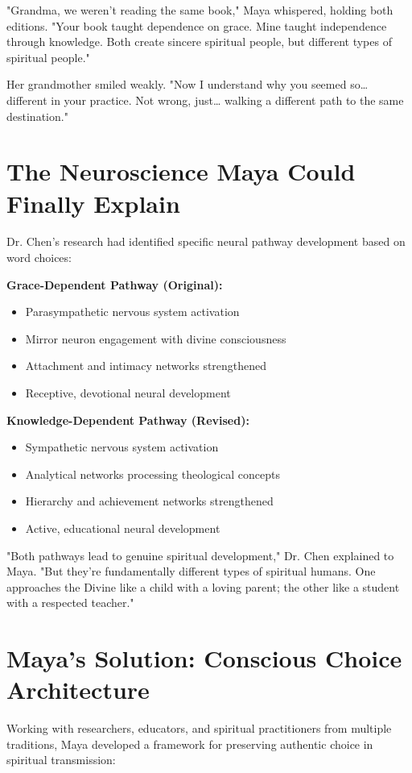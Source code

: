 \documentclass[11pt,twoside]{book}
\begin{document}
"Grandma, we weren't reading the same book," Maya whispered, holding both editions. "Your book taught dependence on grace. Mine taught independence through knowledge. Both create sincere spiritual people, but different types of spiritual people."

Her grandmother smiled weakly. "Now I understand why you seemed so\ldots{} different in your practice. Not wrong, just\ldots{} walking a different path to the same destination."
\section*{The Neuroscience Maya Could Finally Explain}
\label{sec:orgbb6918a}

Dr. Chen's research had identified specific neural pathway development based on word choices:

\textbf{\textbf{Grace-Dependent Pathway (Original):}}
\begin{itemize}
\item Parasympathetic nervous system activation
\item Mirror neuron engagement with divine consciousness
\item Attachment and intimacy networks strengthened
\item Receptive, devotional neural development
\end{itemize}

\textbf{\textbf{Knowledge-Dependent Pathway (Revised):}}
\begin{itemize}
\item Sympathetic nervous system activation
\item Analytical networks processing theological concepts
\item Hierarchy and achievement networks strengthened
\item Active, educational neural development
\end{itemize}

"Both pathways lead to genuine spiritual development," Dr. Chen explained to Maya. "But they're fundamentally different types of spiritual humans. One approaches the Divine like a child with a loving parent; the other like a student with a respected teacher."
\section*{Maya's Solution: Conscious Choice Architecture}
\label{sec:org75a8b25}

Working with researchers, educators, and spiritual practitioners from multiple traditions, Maya developed a framework for preserving authentic choice in spiritual transmission:
\end{document}
